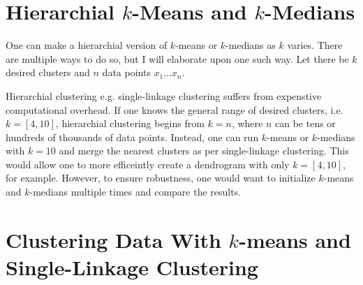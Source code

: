 \documentclass{article}
\begin{document}
\section[short]{Hierarchial $k$-Means and $k$-Medians}

        One can make a hierarchial version of $k$-means or $k$-medians as $k$ varies. There are multiple ways to do so, but I will elaborate upon one such way. Let there be $k$ desired clusters and $n$ data points $x_1 \ldots x_n$.

        Hierarchial clustering e.g. single-linkage clustering suffers from expenstive computational overhead. If one knows the general range of desired clusters, i.e. $k=[4,10]$, hierarchial clustering begins from $k=n$, where $n$ can be tens or hundreds of thousands of data points. Instead, one can run $k$-means or $k$-medians with $k=10$ and merge the nearest clusters as per single-linkage clustering. This would allow one to more efficeintly create a dendrogram with only $k=[4,10]$, for example. However, to ensure robustness, one would want to initialize $k$-means and $k$-medians multiple times and compare the results.

\section[short]{Clustering Data With $k$-means and \\ Single-Linkage Clustering}
             
\end{document}
